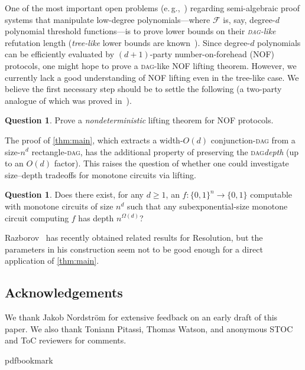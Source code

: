 \documentclass[11pt]{article}
\numberwithin{equation}{section}
\theoremstyle{definition}
\newtheorem{question}[theorem]{Question}
\theoremstyle{plain}
\newcommand{\eg}{e.\,g.}
\newcommand{\DAG}{\textsc{dag}}
\newcommand{\DAGspace}{\textsc{dag}\xspace}
\newcommand{\calF}{\mathcal{F}}
\begin{document}
One of the most important open problems (\eg,~\cite[\S5]{razborov16proof}) regarding semi-algebraic proof systems that manipulate low-degree polynomials---where $\calF$ is, say, degree-$d$ polynomial threshold functions---is to prove lower bounds on their \emph{\DAG-like} refutation length (\emph{tree-like} lower bounds are known~\cite{beame07lower,goos14cbs}). Since degree-$d$ polynomials can be efficiently evaluated by $(d+1)$-party number-on-forehead (NOF) protocols, one might hope to prove a \DAG-like NOF lifting theorem. However, we currently lack a good understanding of NOF lifting even in the tree-like case. We believe the first necessary step should be to settle the following (a two-party analogue of which was proved in~\cite{goos16rectangles}).
\begin{question}
Prove a \emph{nondeterministic} lifting theorem for NOF protocols.
\end{question}

The proof of \autoref{thm:main}, which extracts a width-$O(d)$ conjunction-\DAGspace from a size-$n^d$ rectangle-\DAGspace, has the additional property of preserving the \DAGspace \emph{depth} (up to an $O(d)$ factor). This raises the question of whether one could investigate size--depth tradeoffs for monotone circuits via lifting.
\begin{question}
Does there exist, for any $d\geq 1$, an $f\colon\{0,1\}^n\to\{0,1\}$ computable with monotone circuits of size $n^d$ such that any subexponential-size monotone circuit computing $f$ has depth $n^{\Omega(d)}$?
\end{question}
Razborov~\cite{razborov16new} has recently obtained related results for Resolution, but the parameters in his construction seem not to be good enough for a direct application of \autoref{thm:main}.

\medskip\bigskip
\subsection*{Acknowledgements}
We thank Jakob Nordstr\"om for extensive feedback on an early draft of this
%
paper.   %
We also thank Toniann Pitassi, Thomas Watson, and anonymous STOC and ToC reviewers for comments. 



\newcommand{\prelim}{Preliminary version in\ }
\providecommand{\bibhead}[1]{}
\expandafter\ifx\csname pdfbookmark\endcsname\relax%
  \providecommand{\tocrefpdfbookmark}{}
\else\providecommand{\tocrefpdfbookmark}{%
   \hypertarget{tocreferences}{}%
   \pdfbookmark[1]{References}{tocreferences}}%
\fi
\end{document}
